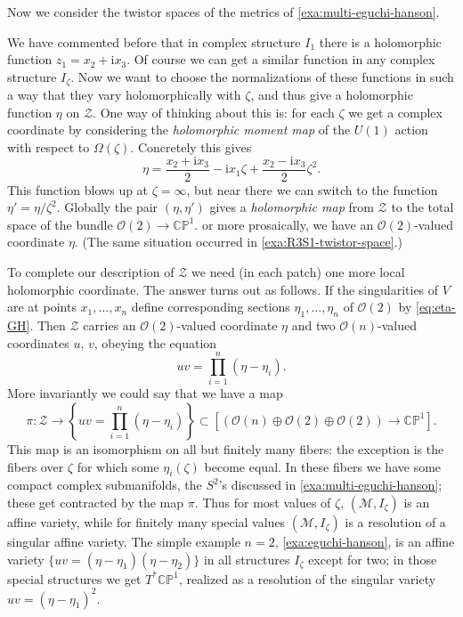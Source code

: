 \documentclass[12pt,letterpaper,reqno]{article}
\numberwithin{equation}{section}
\newcommand{\cZ}{\ensuremath{\mathcal Z}}
\newcommand{\cM}{\ensuremath{\mathcal M}}
\newcommand{\cO}{\ensuremath{\mathcal O}}
\newcommand{\C}{\ensuremath{\mathbb C}}
\newcommand{\PP}{\ensuremath{\mathbb P}}
\newcommand{\I}{{\mathrm i}}
\newcommand{\ti}[1]{\textit{#1}}
\begin{document}
\begin{example} \label{exa:multi-eguchi-hanson-twistor}
Now we consider the twistor spaces of the metrics
of \autoref{exa:multi-eguchi-hanson}.

We have commented before that in complex structure $I_1$ there
is a holomorphic function $z_1 = x_2 + \I x_3$.
Of course we can get a similar function in any complex structure
$I_\zeta$.
Now we want to choose the normalizations of these functions
in such a way that they vary holomorphically with $\zeta$, and thus give
a holomorphic function $\eta$ on $\cZ$.
One way of thinking about this is:
for each $\zeta$ we get a complex coordinate by considering
the \ti{holomorphic moment map} of the $U(1)$ action 
with respect to $\Omega(\zeta)$. Concretely this gives
\begin{equation} \label{eq:eta-GH}
  \eta = \frac{x_2 + \I x_3}{2} - \I x_1 \zeta + \frac{x_2 - \I x_3}{2} \zeta^2. 
\end{equation}
This function blows up at $\zeta = \infty$, but near there we can 
switch to the function $\eta' = \eta / \zeta^2$. Globally the pair
$(\eta,\eta')$ gives a \ti{holomorphic map} 
from $\cZ$ to the total space of the bundle
$\cO(2) \to \C\PP^1$. or more prosaically, we have an $\cO(2)$-valued
coordinate $\eta$. (The same situation occurred in \autoref{exa:R3S1-twistor-space}.)

To complete our description of $\cZ$ we need (in each patch) one more local holomorphic coordinate. The answer turns out as follows.
If the singularities of $V$ are at points $x_1, \dots, x_n$ define
corresponding sections $\eta_1, \dots, \eta_n$ of $\cO(2)$ by
\eqref{eq:eta-GH}. Then $\cZ$ carries an $\cO(2)$-valued
coordinate $\eta$ and two $\cO(n)$-valued coordinates $u$, $v$,
obeying the equation
\begin{equation} \label{eq:multi-eh-uv}
  uv = \prod_{i=1}^n (\eta - \eta_i).
\end{equation}
More invariantly we could say that we have a map
\begin{equation}
 \pi: \cZ \to \left\{ uv = \prod_{i=1}^n (\eta - \eta_i) \right\} \subset [(\cO(n) \oplus \cO(2) \oplus \cO(2)) \to \C\PP^1].
\end{equation}
This map is an isomorphism on all but finitely many fibers:
the exception is the fibers over $\zeta$ for which some $\eta_i(\zeta)$ become
equal. In these fibers we have some compact complex submanifolds,
the $S^2$'s discussed in \autoref{exa:multi-eguchi-hanson};
these get contracted by the map $\pi$. Thus for most values of $\zeta$,
$(\cM, I_\zeta)$ is an affine variety, while for finitely many special 
values $(\cM, I_\zeta)$ is a resolution of a singular affine variety. 
The simple example $n=2$, \autoref{exa:eguchi-hanson}, is an affine variety
$\{uv = (\eta - \eta_1)(\eta - \eta_2)\}$ in all structures $I_\zeta$ except 
for two; in those special structures we get
$T^* \C\PP^1$, realized as a resolution of the singular
variety $uv = (\eta - \eta_1)^2$.


\end{example}
\end{document}
